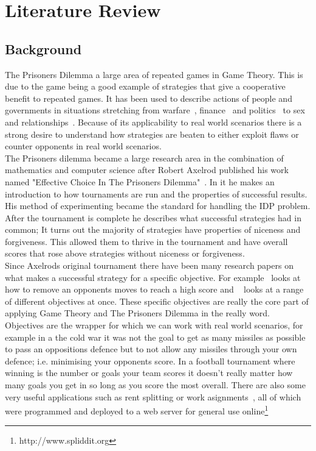 
\chapter{Literature Review}\label{ch:literature}
\section{Background}\label{sec:background}
The Prisoners Dilemma a large area of repeated games in Game Theory.
This is due to the game being a good example of strategies that give a cooperative benefit to repeated games.
It has been used to describe actions of people and governments in situations stretching from warfare~\cite{tooby1988war,aumann1992handbook}, finance~\cite{cable1997finance} and politics~\cite{snidal1985Politics} to sex and relationships~\cite{low2015sex}.
Because of its applicability to real world scenarios there is a strong desire to understand how strategies are beaten to either exploit flaws or counter opponents in real world scenarios. \\

The Prisoners dilemma became a large research area in the combination of mathematics and computer science after Robert Axelrod published his work named "Effective Choice In The Prisoners Dilemma"~\cite{axelrod1980effective}. 
In it he makes an introduction to how tournaments are run and the properties of successful results.
His method of experimenting became the standard for handling the IDP problem.
After the tournament is complete he describes what successful strategies had in common; 
It turns out the majority of strategies have properties of niceness and forgiveness.
This allowed them to thrive in the tournament and have overall scores that rose above strategies without niceness or forgiveness. \\

Since Axelrods original tournament there have been many research papers on what makes a successful strategy for a specific objective.
For example~\cite{press2012iterated} looks at how to remove an opponents moves to reach a high score and ~\cite{mittal2009optimal} looks at a range of different objectives at once.
These specific objectives are really the core part of applying Game Theory and The Prisoners Dilemma in the really word. 
Objectives are the wrapper for which we can work with real world scenarios, for example in a the cold war it was not the goal to get as many missiles as possible to pass an oppositions defence but to not allow any missiles through your own defence; i.e. minimising your opponents score. 
In a football tournament where winning is the number or goals your team scores it doesn't really matter how many goals you get in so long as you score the most overall.
There are also some very useful applications such as rent splitting or work asignments~\cite{goldman2015spliddit}, all of which were programmed and deployed to a web server for general use online\footnote{http://www.spliddit.org}


